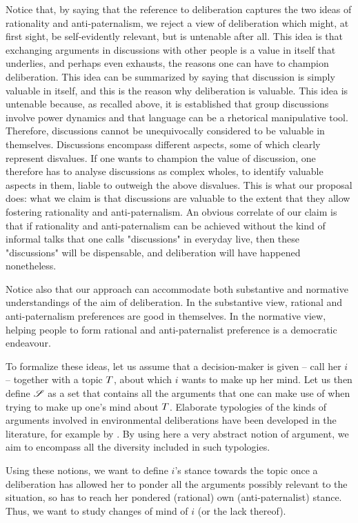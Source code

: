 \documentclass[version=3.21, pagesize, twoside=off, bibliography=totoc, DIV=calc, fontsize=12pt, a4paper, french, english]{scrartcl}
\begin{document}
{Notice that, by saying that the reference to deliberation captures the two ideas of rationality and anti-paternalism, we reject a view of deliberation which might, at first sight, be self-evidently relevant, but is untenable after all. This idea is that exchanging arguments in discussions with other people is a value in itself that underlies, and perhaps even exhausts, the reasons one can have to champion deliberation. This idea can be summarized by saying that discussion is simply valuable in itself, and this is the reason why deliberation is valuable. This idea is untenable because, as recalled above, it is established that group discussions involve power dynamics and that language can be a rhetorical manipulative tool. Therefore, discussions cannot be unequivocally considered to be valuable in themselves. Discussions encompass different aspects, some of which clearly represent disvalues. If one wants to champion the value of discussion, one therefore has to analyse discussions as complex wholes, to identify valuable aspects in them, liable to outweigh the above disvalues. This is what our proposal does: what we claim is that discussions are valuable to the extent that they allow fostering rationality and anti-paternalism. An obvious correlate of our claim is that if rationality and anti-paternalism can be achieved without the kind of informal talks that one calls "discussions" in everyday live, then these "discussions" will be dispensable, and deliberation will have happened nonetheless. 

Notice also that our approach can accommodate both substantive and normative understandings of the aim of deliberation. In the substantive view, rational and anti-paternalism preferences are good in themselves. In the normative view, helping people to form rational and anti-paternalist preference is a democratic endeavour.

To formalize these ideas, let us assume that a decision-maker is given -- call her $i$ -- together with a topic $T$, about which $i$ wants to make up her mind. 
Let us then define $\mathscr{S}$ as a set that contains all the arguments that one can make use of when trying to make up one’s mind about $T$.
Elaborate typologies of the kinds of arguments involved in environmental deliberations have been developed in the literature, for example by \citet{chateauraynaud_contrainte_2007}. 
By using here a very abstract notion of argument, we aim to encompass all the diversity included in such typologies. 

Using these notions, we want to define $i$’s stance towards the topic once a deliberation has allowed her to ponder all the arguments possibly relevant to the situation, so has to reach her pondered (rational) own (anti-paternalist) stance. 
Thus, we want to study changes of mind of $i$ (or the lack thereof).

}
\end{document}
